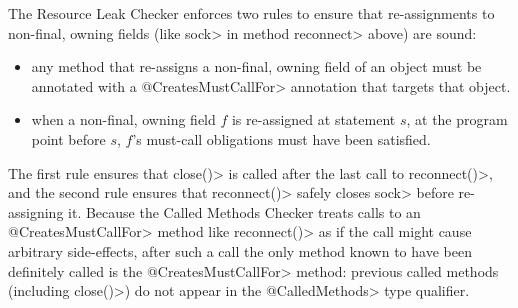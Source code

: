 The Resource Leak Checker enforces two rules to ensure that re-assignments
to non-final, owning fields (like \<sock> in method \<reconnect> above) are
sound:
\begin{itemize}
\item any method that re-assigns a non-final, owning field of an object
  must be annotated with a \<@CreatesMustCallFor> annotation
  that targets that object.
\item when a non-final, owning field $f$ is re-assigned at statement $s$,
  at the program point before $s$, $f$'s must-call obligations must have been satisfied.
\end{itemize}
\noindent
The first rule ensures that \<close()> is called after the last call
to \<reconnect()>, and the second rule ensures that \<reconnect()>
safely closes \<sock> before re-assigning it. Because the Called Methods Checker
treats calls to an \<@CreatesMustCallFor> method like \<reconnect()> as if the call might
cause arbitrary side-effects, after such a call the only method known to have been
definitely called is the \<@CreatesMustCallFor> method: previous called
methods (including \<close()>) do not appear in the \<@CalledMethods> type qualifier.


